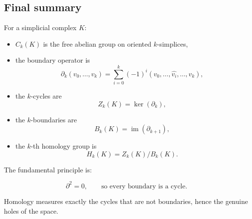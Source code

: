 \documentclass[12pt,a4paper]{article}
\theoremstyle{notespace}
\begin{document}
\subsection{Final summary}

For a simplicial complex \(K\):

\begin{itemize}
	\item \(C_k(K)\) is the free abelian group on oriented \(k\)-simplices,
	\item the boundary operator is
	\[
	\partial_k(v_0,\dots,v_k)
	=
	\sum_{i=0}^{k}(-1)^i(v_0,\dots,\widehat{v_i},\dots,v_k),
	\]
	\item the \(k\)-cycles are
	\[
	Z_k(K)=\ker(\partial_k),
	\]
	\item the \(k\)-boundaries are
	\[
	B_k(K)=\operatorname{im}(\partial_{k+1}),
	\]
	\item the \(k\)-th homology group is
	\[
	H_k(K)=Z_k(K)/B_k(K).
	\]
\end{itemize}

The fundamental principle is:

\[
\partial^2=0,
\qquad\text{so every boundary is a cycle.}
\]

Homology measures exactly the cycles that are not boundaries, hence the genuine holes of the space.
\end{document}
